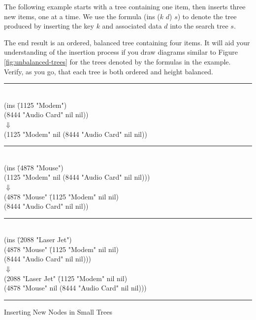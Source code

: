 \begin{aside}
The following example starts with a tree containing one item,
then inserts three new items, one at a time.
We use the formula (ins ($k$ $d$) $s$) to denote
the tree produced by inserting the key $k$ and associated
data $d$ into the search tree $s$.

The end result is an ordered,
balanced tree containing four items.
It will aid your understanding
of the insertion process if you draw diagrams similar to Figure
\ref{fig:unbalanced-trees} for the trees denoted by the formulas in the example.
Verify, as you go, that each tree is both ordered and height balanced.
\begin{center}
\begin{tabbing}
%
\vspace*{-1.5\topsep}
\rule{\textwidth}{0.4pt}
\vspace*{-\topsep}
%
\\
(ins \= (1125 "Modem") \\
     \> (8444 "Audio Card" nil nil)) \\
     \> $\Downarrow$ \\
(1125 "Modem" nil (8444 "Audio Card" nil nil)) \\
%
\vspace*{-1.5\topsep}
\rule{\textwidth}{0.4pt}%
\vspace*{-\topsep}
%
\\
(ins \= (4878 "Mouse") \\
     \> (1125 "Modem" nil (8444 "Audio Card" nil nil))) \\
     \> $\Downarrow$ \\
(4878 "Mouse" \= (1125 "Modem"      nil nil)  \\
              \> (8444 "Audio Card" nil nil)) \\
%
\vspace*{-1.5\topsep}
\rule{\textwidth}{0.4pt}%
\vspace*{-\topsep}
%
\\
(ins \= (2088 "Laser Jet") \\
     \> (4878 "Mouse" \= (1125 "Modem" nil nil) \\
     \>               \> (8444 "Audio Card" nil nil))) \\
     \> $\Downarrow$ \\
(2088 "Laser Jet" \= (1125 "Modem" nil nil) \\
                  \> (4878 "Mouse" nil (8444 "Audio Card" nil nil))) \\
%
\vspace*{-1.5\topsep}
\rule{\textwidth}{0.4pt}%
\vspace*{-\topsep}
%
\end{tabbing}
\end{center}

\caption{Inserting New Nodes in Small Trees}
\label{aside:insertion-example}
\end{aside}

